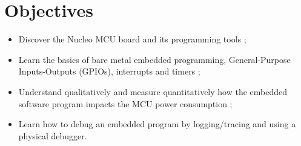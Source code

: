 \section*{Objectives}

\begin{itemize}
    \item Discover the Nucleo MCU board and its programming tools ;
    \item Learn the basics of bare metal embedded programming, General-Purpose Inputs-Outputs (GPIOs), interrupts and timers ;
    \item Understand qualitatively and measure quantitatively how the embedded software program impacts the MCU power consumption ;
    \item Learn how to debug an embedded program by logging/tracing and using a physical debugger.
\end{itemize}

